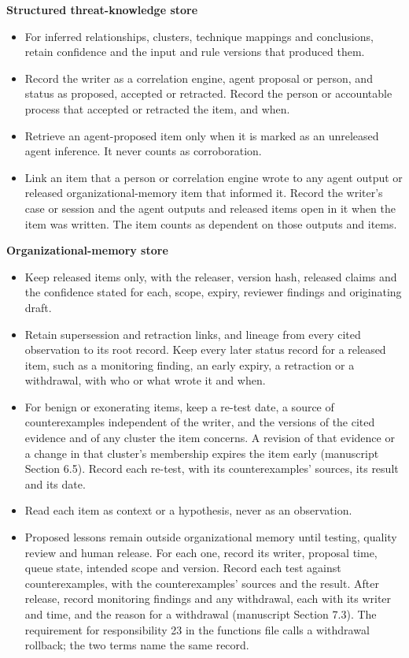 \documentclass[
  11pt,
]{article}
\providecommand{\tightlist}{%
  \setlength{\itemsep}{0pt}\setlength{\parskip}{0pt}}
\renewcommand{\tightlist}{\setlength{\itemsep}{0pt plus 1pt}\setlength{\parskip}{0pt}}
\begin{document}

\textbf{Structured threat-knowledge store}

\begin{itemize}
\tightlist
\item
  For inferred relationships, clusters, technique mappings and
  conclusions, retain confidence and the input and rule versions that
  produced them.
\item
  Record the writer as a correlation engine, agent proposal or person,
  and status as proposed, accepted or retracted. Record the person or
  accountable process that accepted or retracted the item, and when.
\item
  Retrieve an agent-proposed item only when it is marked as an
  unreleased agent inference. It never counts as corroboration.
\item
  Link an item that a person or correlation engine wrote to any agent
  output or released organizational-memory item that informed it. Record
  the writer's case or session and the agent outputs and released items
  open in it when the item was written. The item counts as dependent on
  those outputs and items.
\end{itemize}


\textbf{Organizational-memory store}

\begin{itemize}
\tightlist
\item
  Keep released items only, with the releaser, version hash, released
  claims and the confidence stated for each, scope, expiry, reviewer
  findings and originating draft.
\item
  Retain supersession and retraction links, and lineage from every cited
  observation to its root record. Keep every later status record for a
  released item, such as a monitoring finding, an early expiry, a
  retraction or a withdrawal, with who or what wrote it and when.
\item
  For benign or exonerating items, keep a re-test date, a source of
  counterexamples independent of the writer, and the versions of the
  cited evidence and of any cluster the item concerns. A revision of
  that evidence or a change in that cluster's membership expires the
  item early (manuscript Section 6.5). Record each re-test, with its
  counterexamples' sources, its result and its date.
\item
  Read each item as context or a hypothesis, never as an observation.
\item
  Proposed lessons remain outside organizational memory until testing,
  quality review and human release. For each one, record its writer,
  proposal time, queue state, intended scope and version. Record each
  test against counterexamples, with the counterexamples' sources and
  the result. After release, record monitoring findings and any
  withdrawal, each with its writer and time, and the reason for a
  withdrawal (manuscript Section 7.3). The requirement for
  responsibility 23 in the functions file calls a withdrawal rollback;
  the two terms name the same record.
\end{itemize}
\end{document}
